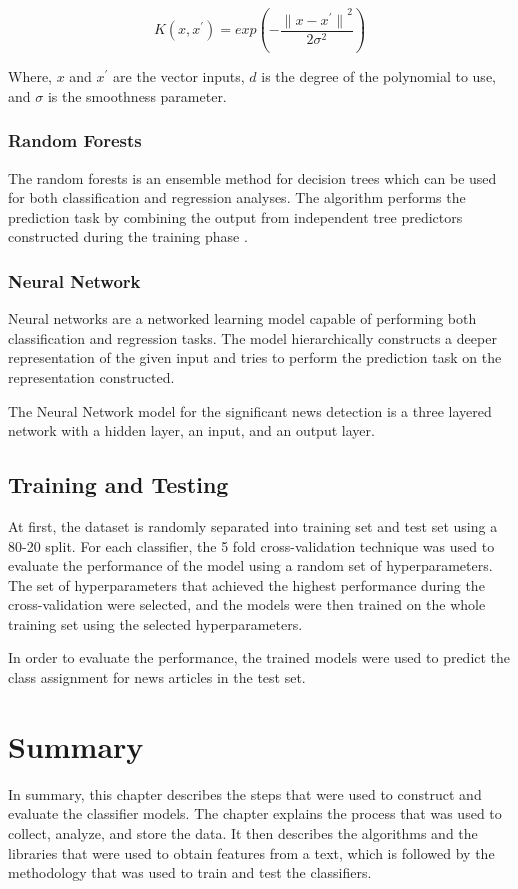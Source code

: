 \begin{equation}
    \label{eq:rbf_kernel}
    K(x, x^{'}) = exp(- \frac{{\lVert x - x^{'} \rVert}^{2}}{2 \sigma^{2}})
\end{equation}

\noindent
Where, $x$ and $x^{'}$ are the vector inputs, $d$ is the degree of the polynomial to use, and $\sigma$ is the smoothness parameter.

\subsubsection{Random Forests}
The random forests\cite{breiman2001random} is an ensemble method for decision trees\cite{quinlan1986induction} which can be used for both classification and regression analyses. The algorithm performs the prediction task by combining the output from independent tree predictors constructed during the training phase \cite{breiman2001random}. 

\subsubsection{Neural Network}
Neural networks are a networked learning model capable of performing both classification and regression tasks. The model hierarchically constructs a deeper representation of the given input and tries to perform the prediction task on the representation constructed. 

The Neural Network model for the significant news detection is a three layered network with a hidden layer, an input, and an output layer.

\subsection{Training and Testing}
At first, the dataset is randomly separated into training set and test set using a 80-20 split. For each classifier, the 5 fold cross-validation technique was used to evaluate the performance of the model using a random set of hyperparameters. The set of hyperparameters that achieved the highest performance during the cross-validation were selected, and the models were then trained on the whole training set using the selected hyperparameters.

In order to evaluate the performance, the trained models were used to predict the class assignment for news articles in the test set. 

\section{Summary}
In summary, this chapter describes the steps that were used to construct and evaluate the classifier models. The chapter explains the process that was used to collect, analyze, and store the data. It then describes the algorithms and the libraries that were used to obtain features from a text, which is followed by the methodology that was used to train and test the classifiers.